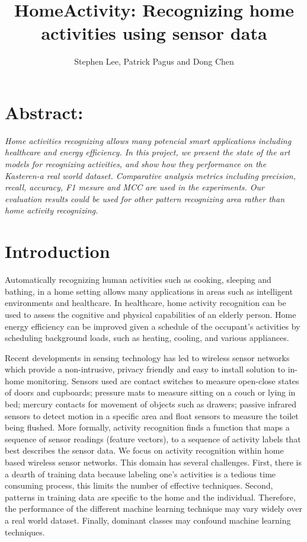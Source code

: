 \documentclass[11pt, oneside]{article}   	%
\title{HomeActivity: Recognizing home activities using sensor data}
\author{Stephen Lee, Patrick Pagus and Dong Chen}
\begin{document}
\maketitle
\section{Abstract:}
\textit{
Home activities recognizing allows many potencial smart applications including healthcare and energy efficiency. In this project, we present the state of the art models for recognizing activities, and show how they performance on the Kasteren-a real world dataset. Comparative analysis metrics including precision, recall, accuracy, F1 mesure and MCC are used in the experiments. Our evaluation results could be used for other pattern recognizing area rather than home activity recognizing.}

\section{Introduction}

Automatically recognizing human activities such as cooking, sleeping and bathing, in a home setting allows many applications in areas such as intelligent environments and healthcare. In healthcare, home activity recognition can be used to assess the cognitive and physical capabilities of an elderly person. Home energy efficiency can be improved given a schedule of the occupant's activities by scheduling background loads, such as heating, cooling, and various appliances. 

Recent developments in sensing technology has led to wireless sensor networks which provide a non-intrusive, privacy friendly and easy to install solution to in-home monitoring. Sensors used are contact switches to measure open-close states of doors and cupboards; pressure mats to measure sitting on a couch or lying in bed; mercury contacts for movement of objects such as drawers; passive infrared sensors to detect motion in a specific area and float sensors to measure the toilet being flushed. 
More formally, activity recognition finds a function that maps a sequence of sensor readings (feature vectors), to a sequence of activity labels that best describes the sensor data. We focus on activity recognition within home based wireless sensor networks. This domain has several challenges. First, there is a dearth of training data because labeling one's activities is a tedious time consuming process, this limits the number of effective techniques. Second, patterns in training data are specific to the home and the individual. Therefore, the performance of the different machine learning technique may vary widely over a real world dataset. Finally, dominant classes may confound machine learning techniques.
\end{document}
